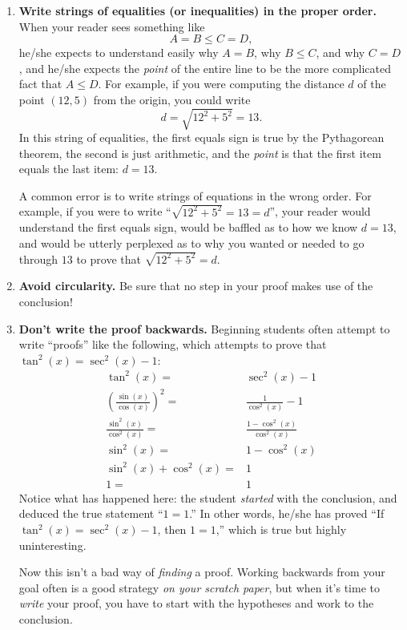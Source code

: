 \begin{enumerate}
\item \textbf{Write strings of equalities (or inequalities) in the proper order.}
	When your reader sees something like
	$$A=B\leq C=D,$$
	he/she expects to understand easily why $A=B$, why $B\leq C$, and why $C=D$,
	and he/she expects the \emph{point} of the entire line to be the more complicated fact that $A\leq D$.
	For example, if you were computing the distance $d$ of the point $(12,5)$ from the origin,
	you could write
	$$d = \sqrt{12^2+5^2} = 13.$$
	In this string of equalities, the first equals sign is true by the Pythagorean theorem, 
	the second is just arithmetic, and the \emph{point} is that the first item equals the last item: $d=13$.
	
	A common error is to write strings of equations in the wrong order.
	For example, if you were to write ``$\sqrt{12^2+5^2}=13=d$'',
	your reader would understand the first equals sign,
	would be baffled as to how we know $d=13$,
	and would be utterly perplexed as to why you wanted or needed to go through $13$ to prove that $\sqrt{12^2+5^2}=d$.

\item \textbf{Avoid circularity.}  Be sure that no step in your proof makes use of the conclusion!
	

\item \textbf{Don't write the proof backwards.}
	Beginning students often attempt to write ``proofs'' like the following, which attempts to prove that $\tan^2(x)  = \sec^2(x) - 1$:
\begin{align*}
 \tan^2(x) =& \sec^2(x) - 1 \\
\left(\frac{\sin(x)}{\cos(x)}\right)^2 =& \frac{1}{\cos^2(x)} - 1 \\
\frac{\sin^2(x)}{\cos^2(x)} =&  \frac{1-\cos^2(x)}{\cos^2(x)} \\
\sin^2(x) =& 1-\cos^2(x) \\
\sin^2(x) + \cos^2(x) =& 1 \\
1 =& 1
\end{align*}        
	Notice what has happened here:  the student \emph{started} with the conclusion,
	and deduced the true statement ``$1=1$.''
	In other words, he/she has proved ``If $\tan^2(x) = \sec^2(x) - 1$, then $1=1$,''
	which is true but highly uninteresting.
	
	Now this isn't a bad way of \emph{finding} a proof.
	Working backwards from your goal often is a good strategy \emph{on your scratch paper},
	but when it's time to \emph{write} your proof,
	you have to start with the hypotheses and work to the conclusion.


\end{enumerate}
